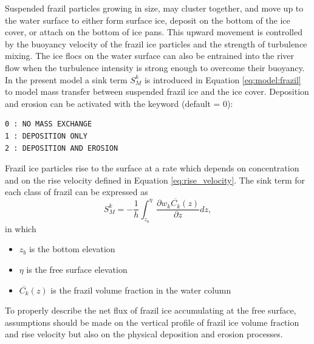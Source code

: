 Suspended frazil particles growing in size, may cluster
together, and move up to the water surface to either form surface ice, deposit on the bottom
of the ice cover, or attach on the bottom of ice pans. This upward movement is controlled by the
buoyancy velocity of the frazil ice particles and the strength of turbulence mixing. The ice flocs
on the water surface can also be entrained into the river flow when the turbulence intensity is
strong enough to overcome their buoyancy.
In the present model a sink term $S_M^k$ is introduced in Equation \ref{eq:model:frazil} to model mass transfer between suspended frazil ice and the ice cover.
Deposition and erosion can be activated with the keyword  (default = 0):
\begin{lstlisting}
0 : NO MASS EXCHANGE
1 : DEPOSITION ONLY
2 : DEPOSITION AND EROSION
\end{lstlisting}

Frazil ice particles rise to the surface at a rate which depends on concentration and on the rise velocity defined in Equation \ref{eq:rise_velocity}. 
The sink term for each class of frazil can be expressed as
\begin{equation}
S_M^k = -\dfrac{1}{h} \int_{z_b}^{\eta} \dfrac{ \partial w_k \overline{C_k}(z)}{ \partial z}  dz,
\end{equation}
in which
\begin{itemize}
	\item $z_b$ is the bottom elevation
	\item $\eta$ is the free surface elevation
	\item $\overline{C_k}(z)$ is the frazil volume fraction in the water column
\end{itemize}

To properly describe the net flux of frazil ice accumulating at the free surface, assumptions  
should be made on the vertical profile of frazil ice volume fraction and rise velocity but also on the physical deposition and erosion processes. \newline

